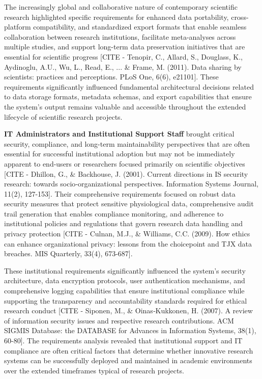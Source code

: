 \documentclass[11pt,a4paper]{report}
\begin{document}
The increasingly global and collaborative nature of contemporary scientific research highlighted specific requirements
for enhanced data portability, cross-platform compatibility, and standardized export formats that enable seamless
collaboration between research institutions, facilitate meta-analyses across multiple studies, and support long-term
data preservation initiatives that are essential for scientific
progress [CITE - Tenopir, C., Allard, S., Douglass, K., Aydinoglu, A.U., Wu, L., Read, E., ... \& Frame, M. (2011). Data sharing by scientists: practices and perceptions. PLoS One, 6(6), e21101].
These requirements significantly influenced fundamental architectural decisions related to data storage formats,
metadata schemas, and export capabilities that ensure the system's output remains valuable and accessible throughout the
extended lifecycle of scientific research projects.

\textbf{IT Administrators and Institutional Support Staff} brought critical security, compliance, and long-term
maintainability perspectives that are often essential for successful institutional adoption but may not be immediately
apparent to end-users or researchers focused primarily on scientific
objectives [CITE - Dhillon, G., \& Backhouse, J. (2001). Current directions in IS security research: towards socio‐organizational perspectives. Information Systems Journal, 11(2), 127-153].
Their comprehensive requirements focused on robust data security measures that protect sensitive physiological data,
comprehensive audit trail generation that enables compliance monitoring, and adherence to institutional policies and
regulations that govern research data handling and privacy
protection [CITE - Culnan, M.J., \& Williams, C.C. (2009). How ethics can enhance organizational privacy: lessons from the choicepoint and TJX data breaches. MIS Quarterly, 33(4), 673-687].

These institutional requirements significantly influenced the system's security architecture, data encryption protocols,
user authentication mechanisms, and comprehensive logging capabilities that ensure institutional compliance while
supporting the transparency and accountability standards required for ethical research
conduct [CITE - Siponen, M., \& Oinas‐Kukkonen, H. (2007). A review of information security issues and respective research contributions. ACM SIGMIS Database: the DATABASE for Advances in Information Systems, 38(1), 60-80].
The requirements analysis revealed that institutional support and IT compliance are often critical factors that
determine whether innovative research systems can be successfully deployed and maintained in academic environments over
the extended timeframes typical of research projects.
\end{document}
